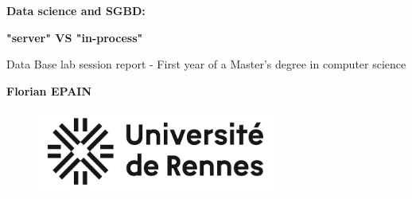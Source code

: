 \documentclass{article} %
\begin{document}

\begin{titlepage}
    \begin{center}
        \vspace*{1cm}
        \Huge
        \textbf{Data science and SGBD:}

        \Huge
        \textbf{"server" VS "in-process"}

        \vspace{0.5cm}
        \LARGE
        Data Base lab session report - First year of a Master's degree in computer science
        \vspace{1.5cm}

        \textbf{Florian EPAIN}


        \vspace{12cm}

        \vspace{0.5cm}
        \begin{figure}[hb]
            \centering
            \includegraphics[width=8cm]{../assets/logos/logoUnivRennes.png}
        \end{figure}

    \end{center}

\end{titlepage}



\tableofcontents
\clearpage







\end{document}
